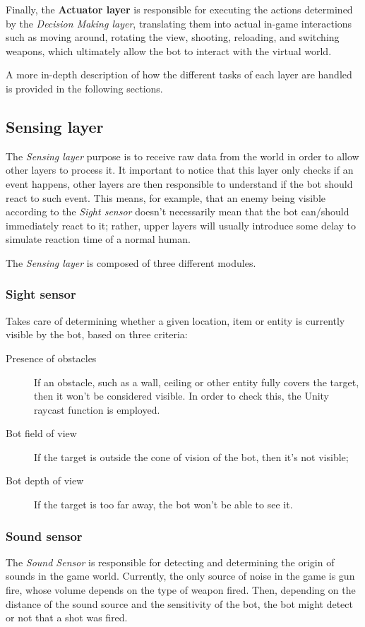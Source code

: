 Finally, the \textbf{Actuator layer} is responsible for executing the actions determined by the \textit{Decision Making layer}, translating them into actual in-game interactions such as moving around, rotating the view, shooting, reloading, and switching weapons, which ultimately allow the bot to interact with the virtual world.

A more in-depth description of how the different tasks of each layer are handled is provided in the following sections.

\subsection{Sensing layer}
The \textit{Sensing layer} purpose is to receive raw data from the world in order to allow other layers to process it.
It important to notice that this layer only checks if an event happens, other layers are then responsible to understand if the bot should react to such event. This means, for example, that an enemy being visible according to the \textit{Sight sensor} doesn’t necessarily mean that the bot can/should immediately react to it; rather, upper layers will usually introduce some delay to simulate reaction time of a normal human.

The \textit{Sensing layer} is composed of three different modules.

\subsubsection{Sight sensor}
Takes care of determining whether a given location, item or entity is currently visible by the bot, based on three criteria:
\begin{description}
\item[Presence of obstacles] If an obstacle, such as a wall, ceiling or other entity fully covers the target, then it won't be considered visible. In order to check this, the Unity raycast function is employed.
\item[Bot field of view] If the target is outside the cone of vision of the bot, then it's not visible;
\item[Bot depth of view] If the target is too far away, the bot won't be able to see it.
\end{description} 

\subsubsection{Sound sensor}
The \textit{Sound Sensor} is responsible for detecting and determining the origin of sounds in the game world. Currently, the only source of noise in the game is gun fire, whose volume depends on the type of weapon fired. Then, depending on the distance of the sound source and the sensitivity of the bot, the bot might detect or not that a shot was fired.


